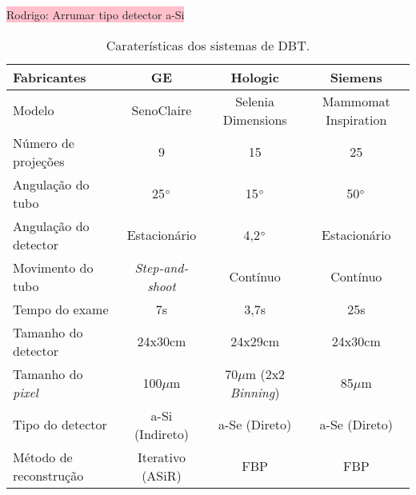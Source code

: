 \colorbox{pink}{Rodrigo: Arrumar tipo detector a-Si}
\begin{table}[H]
	\centering
	\footnotesize
	\caption{Caraterísticas dos sistemas  de \acs{DBT}.}
	\label{tab:tabCap2SistemasDBT}
	\begin{tabular}{l|c|c|c}
		\textbf{Fabricantes}                                       &        \textbf{\acs{GE}}        &                 \textbf{Hologic}                 &   \textbf{Siemens}   \\
		[5pt]
		\hline
		\hline
		\rule[-0.5ex]{0pt}{3ex}
		Modelo &    SenoClaire\texttrademark    & Selenia\textsuperscript{\textregistered} Dimensions\textsuperscript{\textregistered} & Mammomat Inspiration \\ \hline
		\rule[-0.5ex]{0pt}{3ex}
		Número de projeções              &                9                &                        15                        &          25          \\ \hline
		\rule[-0.5ex]{0pt}{3ex}
		Angulação do tubo                &           25$\degree$           &                   15$\degree$                    &     50$\degree$      \\ \hline
		\rule[-0.5ex]{0pt}{3ex}
		Angulação do detector            &          Estacionário           &                   4,2$\degree$                   &     Estacionário     \\ \hline
		\rule[-0.5ex]{0pt}{3ex}
		Movimento do tubo                &     \textit{Step-and-shoot}     &                     Contínuo                     &       Contínuo       \\ \hline
		\rule[-0.5ex]{0pt}{3ex}
		Tempo do exame                   &               7s                &                       3,7s                       &         25s          \\ \hline
		\rule[-0.5ex]{0pt}{3ex}
		Tamanho do detector              &             24x30cm             &                     24x29cm                      &       24x30cm        \\ \hline
		\rule[-0.5ex]{0pt}{3ex}
		Tamanho do \textit{pixel}        &            100$\mu$m            &         70$\mu$m (2x2 \textit{Binning})          &       85$\mu$m       \\ \hline
		\rule[-0.5ex]{0pt}{3ex}
		Tipo do detector                 &         a-Si (Indireto)         &                  a-Se (Direto)                   &    a-Se (Direto)     \\ \hline
		\rule[-0.5ex]{0pt}{3ex}
		Método de reconstrução           & Iterativo (ASiR\textsuperscript{\textregistered}) &                    \acs{FBP}                     &      \acs{FBP}       \\ \hline
	\end{tabular}
	\vspace{2ex}
\end{table}



 
    

